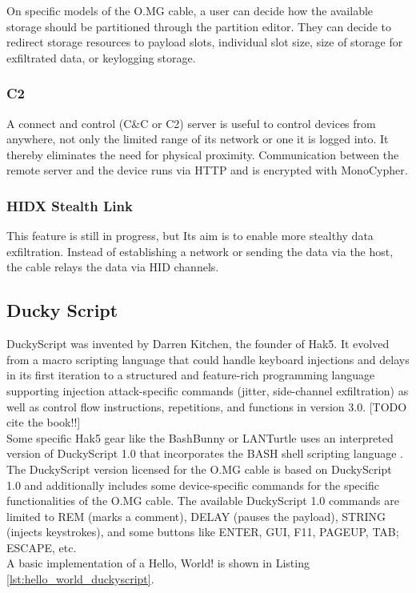 On specific models of the O.MG cable, a user can decide how the available storage should be partitioned through the partition editor. They can decide to redirect storage resources to payload slots, individual slot size, size of storage for exfiltrated data, or keylogging storage. 

\subsubsection{C2}

A connect and control (C\&C or C2) server is useful to control devices from anywhere, not only the limited range of its network or one it is logged into. It thereby eliminates the need for physical proximity. Communication between the remote server and the device runs via HTTP and is encrypted with MonoCypher. 

\subsubsection{HIDX Stealth Link}
This feature is still in progress, but Its aim is to enable more stealthy data exfiltration. Instead of establishing a network or sending the data via the host, the cable relays the data via HID channels.  


\subsection{Ducky Script} \label{DuckyScript}

DuckyScript was invented by Darren Kitchen, the founder of Hak5. It evolved from a macro scripting language that could handle keyboard injections and delays in its first iteration to a structured and feature-rich programming language supporting injection attack-specific commands (jitter, side-channel exfiltration) as well as control flow instructions, repetitions, and functions in version 3.0. \cite{the book} [TODO cite the book!!] \\
Some specific Hak5 gear like the BashBunny or LANTurtle uses an interpreted version of DuckyScript 1.0 that incorporates the BASH shell scripting language \cite{Hak5Usbrubberduckypayloads2024}. The DuckyScript version licensed for the O.MG cable is based on DuckyScript 1.0 and additionally includes some device-specific commands for the specific functionalities of the O.MG cable. The available DuckyScript 1.0 commands are limited to REM (marks a comment), DELAY (pauses the payload), STRING (injects keystrokes), and some buttons like ENTER, GUI, F11, PAGEUP, TAB; ESCAPE, etc. \\
A basic implementation of a Hello, World! is shown in Listing \ref{lst:hello_world_duckyscript}.

